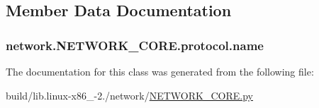 \subsection{Member Data Documentation}
\hypertarget{classnetwork_1_1NETWORK__CORE_1_1protocol_a1909533ebbc06331e4f698e614fe12db}{}
\subsubsection[{name}]{\setlength{\rightskip}{0pt plus 5cm}network.\+N\+E\+T\+W\+O\+R\+K\+\_\+\+C\+O\+R\+E.\+protocol.\+name}\label{classnetwork_1_1NETWORK__CORE_1_1protocol_a1909533ebbc06331e4f698e614fe12db}


The documentation for this class was generated from the following file\+:\begin{DoxyCompactItemize}
\item 
build/lib.\+linux-\/x86\+\_-\/2./network/\hyperlink{build_2lib_8linux-x86__64-2_87_2network_2NETWORK__CORE_8py}{N\+E\+T\+W\+O\+R\+K\+\_\+\+C\+O\+R\+E.\+py}\end{DoxyCompactItemize}
